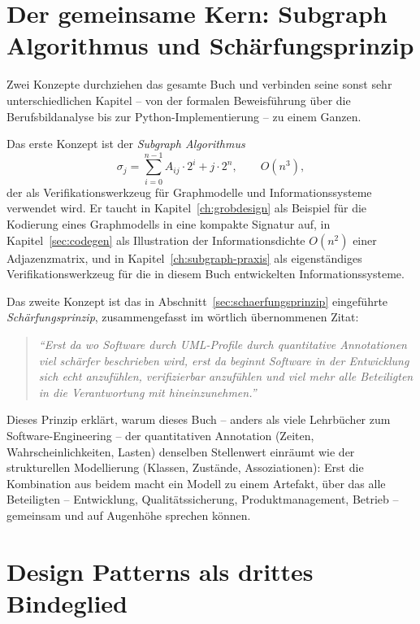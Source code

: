 ﻿\documentclass[a4paper,12pt]{report}
\theoremstyle{definition}
\begin{document}
\section*{Der gemeinsame Kern: Subgraph Algorithmus und Schärfungsprinzip}

Zwei Konzepte durchziehen das gesamte Buch und verbinden seine sonst sehr
unterschiedlichen Kapitel -- von der formalen Beweisführung über die
Berufsbildanalyse bis zur Python-Implementierung -- zu einem Ganzen.

Das erste Konzept ist der \emph{Subgraph Algorithmus}
\[
\sigma_j = \sum_{i=0}^{n-1} A_{ij} \cdot 2^i + j \cdot 2^n, \qquad O(n^3),
\]
der als Verifikationswerkzeug für Graphmodelle und Informationssysteme
verwendet wird. Er taucht in Kapitel~\ref{ch:grobdesign} als Beispiel für
die Kodierung eines Graphmodells in eine kompakte Signatur auf, in
Kapitel~\ref{sec:codegen} als Illustration der Informationsdichte $O(n^2)$
einer Adjazenzmatrix, und in
Kapitel~\ref{ch:subgraph-praxis} als eigenständiges
Verifikationswerkzeug für die in diesem Buch entwickelten
Informationssysteme.

Das zweite Konzept ist das in Abschnitt~\ref{sec:schaerfungsprinzip}
eingeführte \emph{Schärfungsprinzip}, zusammengefasst im wörtlich
übernommenen Zitat:
\begin{quotation}
\noindent\textit{%
``Erst da wo Software durch UML-Profile durch quantitative Annotationen
viel schärfer beschrieben wird, erst da beginnt Software in der Entwicklung
sich echt anzufühlen, verifizierbar anzufühlen und viel mehr alle
Beteiligten in die Verantwortung mit hineinzunehmen.''
}
\end{quotation}
Dieses Prinzip erklärt, warum dieses Buch -- anders als viele Lehrbücher
zum Software-Engineering -- der quantitativen Annotation (Zeiten,
Wahrscheinlichkeiten, Lasten) denselben Stellenwert einräumt wie der
strukturellen Modellierung (Klassen, Zustände, Assoziationen): Erst die
Kombination aus beidem macht ein Modell zu einem Artefakt, über das alle
Beteiligten -- Entwicklung, Qualitätssicherung, Produktmanagement, Betrieb
-- gemeinsam und auf Augenhöhe sprechen können.

\section*{Design Patterns als drittes Bindeglied}
\end{document}
